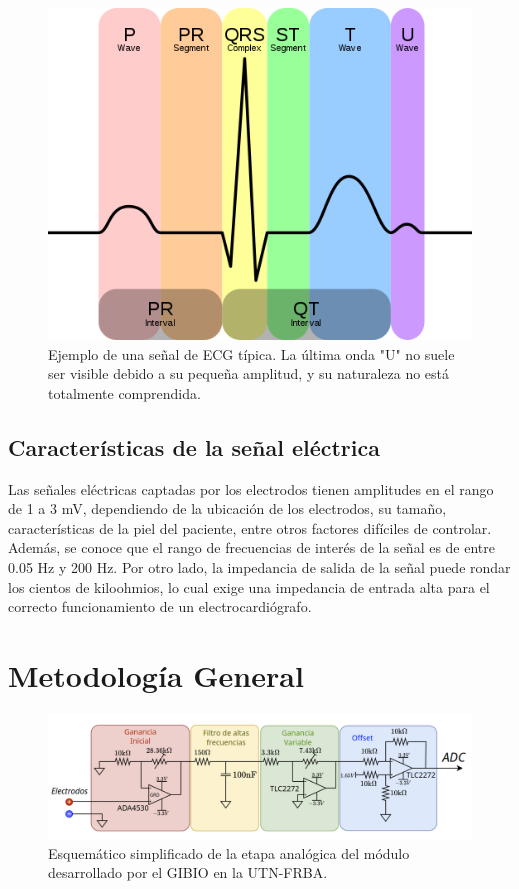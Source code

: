 \documentclass[conference]{IEEEtran}
\begin{document}
\begin{figure}[th]
    \centerline
    {\includegraphics[width=0.9\linewidth]{figs/512px-EKG_Complex_en.svg.png}}
    \caption{Ejemplo de una señal de ECG típica. La última onda "U" no suele ser
    visible debido a su pequeña amplitud, y su naturaleza no está totalmente
    comprendida.}
    \label{fig:ecg_onda}
\end{figure}


\subsection{Características de la señal eléctrica}
\label{electrical_characteristics}

Las señales eléctricas captadas por los electrodos tienen amplitudes en el rango
de 1 a 3 mV, dependiendo de la ubicación de los electrodos, su tamaño,
características de la piel del paciente, entre otros factores difíciles de
controlar. Además, se conoce que el rango de frecuencias de interés de la señal
es de entre 0.05 Hz y 200 Hz. Por otro lado, la impedancia de salida de la señal
puede rondar los cientos de kiloohmios, lo cual exige una impedancia de entrada
alta para el correcto funcionamiento de un electrocardiógrafo.  
 \cite{ecg_signal_amp} \cite{ecg_signal_freq}


\section{Metodología General}

\begin{figure}[hb]
    \centering
    \includegraphics[width=\textwidth]{figs/etapa_analogica.png}
    \caption{Esquemático simplificado de la etapa analógica del módulo
    desarrollado por el GIBIO en la UTN-FRBA.}
    \label{fig:etapa_analogica_esquematico}
\end{figure}
\end{document}
